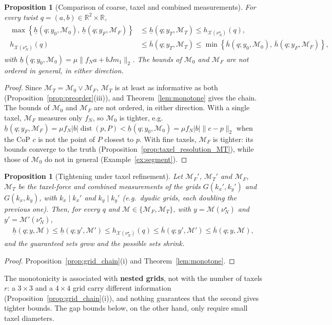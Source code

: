 \documentclass[11pt,a4paper]{article}
\theoremstyle{plain}
\newtheorem{proposition}[theorem]{Proposition}
\newcommand{\X}{\mathcal X}
\begin{document}
\begin{proposition}[Comparison of coarse, taxel and combined measurements]
\label{prop:taxel_refinement}
For every twist $q=(a,b)\in\mathbb R^2\times\mathbb R$,
\begin{align}
\boxed{
\begin{aligned}
\max\left\{\underline h(q;y_0,\mathcal M_0),\,\underline h(q;y_F,\mathcal M_F)\right\}
&\le
\underline h(q;y_T,\mathcal M_T)
\le
h_{\X(\nu_N^\star)}(q),\\
h_{\X(\nu_N^\star)}(q)
&\le
\overline h(q;y_T,\mathcal M_T)
\le
\min\left\{
\overline h(q;y_0,\mathcal M_0),\,
\overline h(q;y_F,\mathcal M_F)
\right\},
\end{aligned}}
\end{align}
with $\underline h(q;y_0,\mathcal M_0)=\mu\|f_Na+bJm_1\|_2$. The bounds of $\mathcal M_0$ and $\mathcal M_F$ are not ordered in general, in either direction.
\end{proposition}
\begin{proof}
    Since $\mathcal M_T=\mathcal M_0\vee\mathcal M_F$, $\mathcal M_T$ is at least as informative as both (Proposition~\ref{prop:preorder}(iii)), and Theorem~\ref{lem:monotone} gives the chain.
    The bounds of $\mathcal M_0$ and $\mathcal M_F$ are not ordered, in either direction. With a single taxel, $\mathcal M_F$ measures only $f_N$, so $\mathcal M_0$ is tighter, e.g.
    $\underline h(q;y_F,\mathcal M_F)=\mu f_N|b|\operatorname{dist}(p,P)<\underline h(q;y_0,\mathcal M_0)=\mu f_N|b|\|c-p\|_2$ when the CoP $c$ is not the point of $P$ closest to $p$.
    With fine taxels, $\mathcal M_F$ is tighter: its bounds converge to the truth (Proposition~\ref{prop:taxel_resolution_MT}), while those of $\mathcal M_0$ do not in general (Example~\ref{ex:segment}).
\end{proof}

\begin{proposition}[Tightening under taxel refinement]
\label{prop:taxel_refinement_MF}
Let $\mathcal M_F'$, $\mathcal M_T'$ and $\mathcal M_F$, $\mathcal M_T$ be the taxel-force and combined measurements of the grids $G(k_x',k_y')$ and $G(k_x,k_y)$, with $k_x\mid k_x'$ and
$k_y\mid k_y'$ (e.g.\ dyadic grids, each doubling the previous one). Then, for every $q$ and $\mathcal M\in\{\mathcal M_F,\mathcal M_T\}$, with $y=\mathcal M(\nu_N^\star)$ and $y'=\mathcal M'(\nu_N^\star)$,
\begin{align}
\boxed{
\underline h(q;y,\mathcal M)
\le
\underline h(q;y',\mathcal M')
\le
h_{\X(\nu_N^\star)}(q)
\le
\overline h(q;y',\mathcal M')
\le
\overline h(q;y,\mathcal M),}
\end{align}
and the guaranteed sets grow and the possible sets shrink.
\end{proposition}
\begin{proof}
    Proposition~\ref{prop:grid_chain}(i) and Theorem~\ref{lem:monotone}.
\end{proof}
The monotonicity is associated with \textbf{nested grids}, not with the number of taxels $r$: a $3\times3$ and a $4\times4$ grid carry different information
(Proposition~\ref{prop:grid_chain}(i)), and nothing guarantees that the second gives tighter bounds. 
The gap bounds below, on the other hand, only require small taxel diameters.
\end{document}
